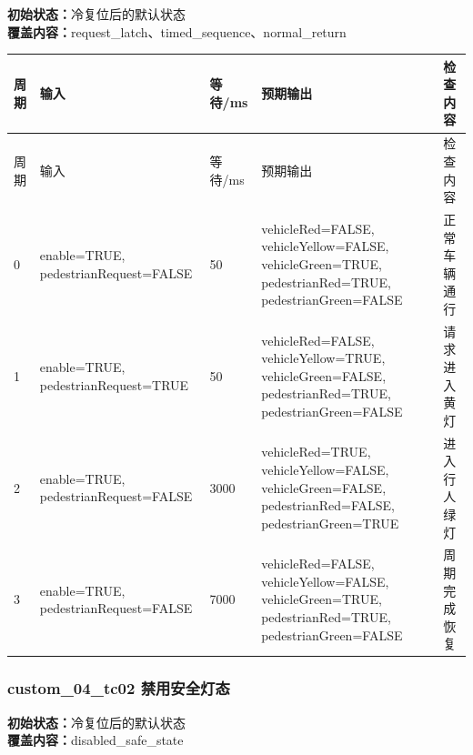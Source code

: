 \noindent\textbf{初始状态：}冷复位后的默认状态\\

\textbf{覆盖内容：}request\_latch、timed\_sequence、normal\_return

\begin{longtable}{L{1.0cm}L{4.7cm}L{1.4cm}L{4.0cm}L{2.1cm}}

\toprule

周期 & 输入 & 等待/ms & 预期输出 & 检查内容\\

\midrule

\endfirsthead

\toprule

周期 & 输入 & 等待/ms & 预期输出 & 检查内容\\

\midrule

\endhead

0 & enable=TRUE, pedestrianRequest=FALSE & 50 & vehicleRed=FALSE, vehicleYellow=FALSE, vehicleGreen=TRUE, pedestrianRed=TRUE, pedestrianGreen=FALSE & 正常车辆通行\\

1 & enable=TRUE, pedestrianRequest=TRUE & 50 & vehicleRed=FALSE, vehicleYellow=TRUE, vehicleGreen=FALSE, pedestrianRed=TRUE, pedestrianGreen=FALSE & 请求进入黄灯\\

2 & enable=TRUE, pedestrianRequest=FALSE & 3000 & vehicleRed=TRUE, vehicleYellow=FALSE, vehicleGreen=FALSE, pedestrianRed=FALSE, pedestrianGreen=TRUE & 进入行人绿灯\\

3 & enable=TRUE, pedestrianRequest=FALSE & 7000 & vehicleRed=FALSE, vehicleYellow=FALSE, vehicleGreen=TRUE, pedestrianRed=TRUE, pedestrianGreen=FALSE & 周期完成恢复\\

\bottomrule

\end{longtable}

\subsubsection{{\ttfamily custom\_04\_tc02} 禁用安全灯态}

\noindent\textbf{初始状态：}冷复位后的默认状态\\

\textbf{覆盖内容：}disabled\_safe\_state

